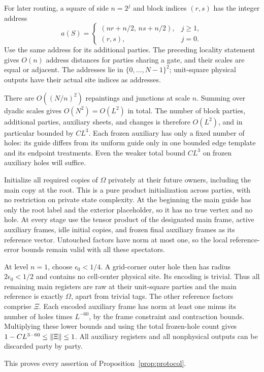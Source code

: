 For later routing, a square of side $n=2^j$ and block indices $(r,s)$
has the integer address
\begin{equation}
 a(S)=
 \begin{cases}
 (nr+n/2,\,ns+n/2),&j\ge1,\\
 (r,s),&j=0.
 \end{cases}
 \label{eq:geometry-addresses}
\end{equation}
Use the same address for its additional parties.  The preceding
locality statement gives $O(n)$ address distances for parties sharing
a gate, and their scales are equal or adjacent.  The addresses lie
in $\{0,\ldots,N-1\}^2$; unit-square physical outputs have their
actual site indices as addresses.

There are $O((N/n)^2)$ repaintings and junctions at scale $n$.
Summing over dyadic scales gives $O(N^2)=O(L^2)$ in total.  The number
of block parties, additional parties, auxiliary sheets, and changes
is therefore $O(L^2)$, and in particular bounded by $C L^3$.
Each frozen auxiliary has only a fixed number of holes: its guide
differs from its uniform guide only in one bounded edge template and
its endpoint treatments.  Even the weaker total bound $C L^3$ on
frozen auxiliary holes will suffice.

Initialize all required copies of $\Omega$ privately at their future
owners, including the main copy at the root.  This is a pure product
initialization across parties, with no restriction on private state
complexity.  At the beginning the main guide has only the root label
and the exterior placeholder, so it has no true vertex and no hole.
At every stage use the tensor product of the designated main frame,
active auxiliary frames, idle initial copies, and frozen final
auxiliary frames as its reference vector.  Untouched factors have
norm at most one, so the local reference-error bounds remain valid
with all these spectators.

At level $n=1$, choose $\epsilon_0<1/4$.  A grid-corner outer hole
then has radius $2\epsilon_0<1/2$ and contains no cell-center physical
site.  Its encoding is trivial.  Thus all remaining main registers
are raw at their unit-square parties and the main reference is
exactly $\Omega$, apart from trivial tags.  The other reference
factors comprise $\Xi$.  Each encoded auxiliary frame has norm at
least one minus its number of holes times $L^{-60}$, by the frame
constraint and contraction bounds.  Multiplying these lower bounds
and using the total frozen-hole count gives
$1-C L^{3-60}\le\lVert \Xi\rVert\le1$.  All auxiliary registers and all
nonphysical outputs can be discarded party by party.

This proves every assertion of Proposition~\ref{prop:protocol}.
